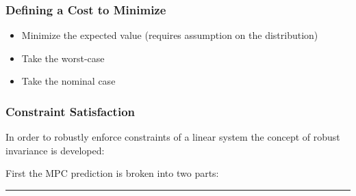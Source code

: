 \documentclass[8pt,a4paper]{scrartcl}
\begin{document}
\begin{multicols*}{3}



\subsubsection{Defining a Cost to Minimize}

\begin{itemize}
\ncompaq
\item Minimize the expected value (requires assumption on the distribution)

\item Take the worst-case
\item Take the nominal case
\end{itemize}


\subsubsection{Constraint Satisfaction}

In order to robustly enforce constraints of a linear system the concept of robust invariance is developed:

\finn

First the MPC prediction is broken into two parts:

{
}

\finn

\hrule


\end{multicols*}
\end{document}
